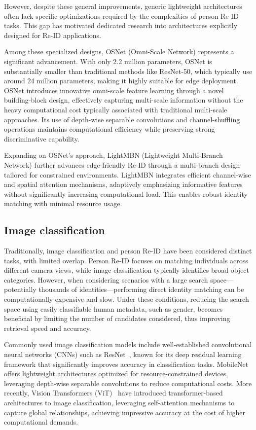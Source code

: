 \documentclass[../main.tex]{subfiles}
\begin{document}
However, despite these general improvements, generic lightweight architectures often lack specific optimizations required by the complexities of person Re-ID tasks. This gap has motivated dedicated research into architectures explicitly designed for Re-ID applications.

Among these specialized designs, OSNet (Omni-Scale Network) \cite{zhou2019omniscalefeaturelearningperson} represents a significant advancement. With only 2.2 million parameters, OSNet is substantially smaller than traditional methods like ResNet-50, which typically use around 24 million parameters, making it highly suitable for edge deployment. OSNet introduces innovative omni-scale feature learning through a novel building-block design, effectively capturing multi-scale information without the heavy computational cost typically associated with traditional multi-scale approaches. Its use of depth-wise separable convolutions and channel-shuffling operations maintains computational efficiency while preserving strong discriminative capability.

Expanding on OSNet's approach, LightMBN (Lightweight Multi-Branch Network) \cite{Herzog_2021} further advances edge-friendly Re-ID through a multi-branch design tailored for constrained environments. LightMBN integrates efficient channel-wise and spatial attention mechanisms, adaptively emphasizing informative features without significantly increasing computational load. This enables robust identity matching with minimal resource usage.

\subsection{Image classification}
\label{sec:image_classification}

Traditionally, image classification and person Re-ID have been considered distinct tasks, with limited overlap. Person Re-ID focuses on matching individuals across different camera views, while image classification typically identifies broad object categories. However, when considering scenarios with a large search space—potentially thousands of identities—performing direct identity matching can be computationally expensive and slow. Under these conditions, reducing the search space using easily classifiable human metadata, such as gender, becomes beneficial by limiting the number of candidates considered, thus improving retrieval speed and accuracy.

Commonly used image classification models include well-established convolutional neural networks (CNNs) such as ResNet~\cite{he2015deepresiduallearningimage}, known for its deep residual learning framework that significantly improves accuracy in classification tasks. MobileNet~\cite{mobilenet} offers lightweight architectures optimized for resource-constrained devices, leveraging depth-wise separable convolutions to reduce computational costs. More recently, Vision Transformers (ViT)~\cite{ViT} have introduced transformer-based architectures to image classification, leveraging self-attention mechanisms to capture global relationships, achieving impressive accuracy at the cost of higher computational demands.
\end{document}
